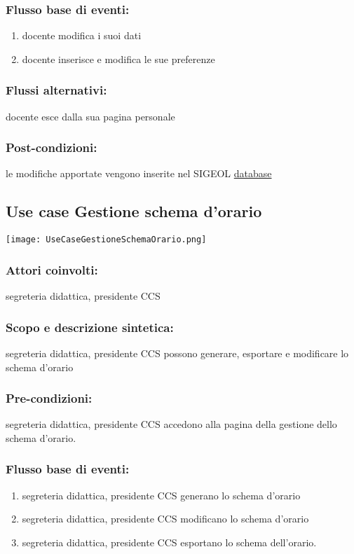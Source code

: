 \documentclass[11pt,a4paper]{article}
\begin{document}
\subsubsection*{Flusso base di eventi:}
\begin{enumerate}
 \item docente modifica i suoi dati 
 \item docente inserisce e modifica le sue preferenze
\end{enumerate}
\subsubsection*{Flussi alternativi:}
docente esce dalla sua pagina personale
\subsubsection*{Post-condizioni:}
le modifiche apportate vengono inserite nel SIGEOL \underline{database}
\subsection{Use case Gestione schema d'orario}
\begin{center} 
 \texttt{[image: UseCaseGestioneSchemaOrario.png]}
\end{center}
\subsubsection*{Attori coinvolti:}
segreteria didattica, presidente CCS
\subsubsection*{Scopo e descrizione sintetica:}
segreteria didattica, presidente CCS possono generare, esportare e modificare lo schema d'orario
\subsubsection*{Pre-condizioni:}
segreteria didattica, presidente CCS accedono alla pagina della gestione dello schema d'orario.
\subsubsection*{Flusso base di eventi:}
\begin{enumerate} 
 \item segreteria didattica, presidente CCS generano lo schema d'orario
 \item segreteria didattica, presidente CCS modificano lo schema d'orario
 \item segreteria didattica, presidente CCS esportano lo schema dell'orario.
\end{enumerate}
\end{document}
